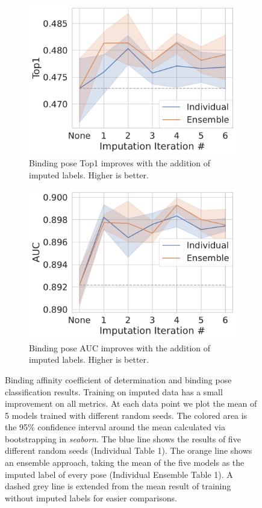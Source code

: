\documentclass[journal=jcisd8,manuscript=article]{achemso}
\begin{document}
\begin{figure}[tbph]
    \begin{subfigure}[t]{0.48\textwidth}
        \centering
        \includegraphics[width=\linewidth]{figures/InitialImpTop1.pdf}
        \caption{Binding pose Top1 improves with the addition of imputed labels. Higher is better.}
    \end{subfigure}
    \hfill
    \begin{subfigure}[t]{0.48\textwidth}
        \centering
        \includegraphics[width=\linewidth]{figures/InitialImpAUC.pdf}
        \caption{Binding pose AUC improves with the addition of imputed labels. Higher is better.}
    \end{subfigure}
    \caption{Binding affinity coefficient of determination and binding pose classification results. Training on imputed data has a small improvement on all metrics. At each data point we plot the mean of 5 models trained with different random seeds. The colored area is the 95\% confidence interval around the mean calculated via bootstrapping in \textit{seaborn}. The blue line shows the results of five different random seeds (Individual Table 1). The orange line shows an ensemble approach, taking the mean of the five models as the imputed label of every pose (Individual Ensemble Table 1). A dashed grey line is extended from the mean result of training without imputed labels for easier comparisons.}
    \label{fig:SuppinitialImp}
\end{figure}
\end{document}
